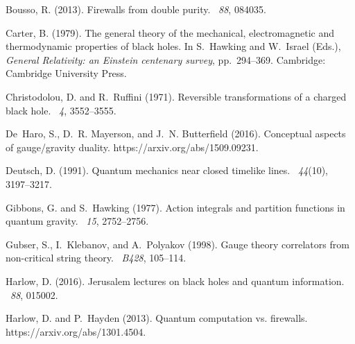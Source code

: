 \documentclass{article}
\begin{document}
\begin{thebibliography}{}
Bousso, R. (2013).
\newblock Firewalls from double purity.
~{\em 88}, 084035.

Carter, B. (1979).
\newblock The general theory of the mechanical, electromagnetic and
  thermodynamic properties of black holes.
\newblock In S.~Hawking and W.~Israel (Eds.), {\em General Relativity: an
  {E}instein centenary survey}, pp.\  294--369. Cambridge: Cambridge University
  Press.

Christodolou, D. and R.~Ruffini (1971).
\newblock Reversible transformations of a charged black hole.
~{\em 4}, 3552--3555.

De~Haro, S., D.~R. Mayerson, and J.~N. Butterfield (2016).
\newblock Conceptual aspects of gauge/gravity duality.
\newblock https://arxiv.org/abs/1509.09231.

Deutsch, D. (1991).
\newblock Quantum mechanics near closed timelike lines.
~{\em 44\/}(10), 3197--3217.

Gibbons, G. and S.~Hawking (1977).
\newblock Action integrals and partition functions in quantum gravity.
~{\em 15}, 2752--2756.

Gubser, S., I.~Klebanov, and A.~Polyakov (1998).
\newblock Gauge theory correlators from non-critical string theory.
~{\em B428}, 105--114.

Harlow, D. (2016).
\newblock Jerusalem lectures on black holes and quantum information.
~{\em 88}, 015002.

Harlow, D. and P.~Hayden (2013).
\newblock Quantum computation vs. firewalls.
\newblock https://arxiv.org/abs/1301.4504.


\end{thebibliography}
\end{document}
